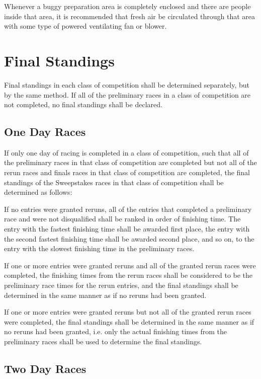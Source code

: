 	Whenever a buggy preparation area is completely enclosed and there are people
	inside that area, it is recommended that fresh air be circulated through that
	area with some type of powered ventilating fan or blower.

\section{Final Standings}

	Final standings in each class of competition shall be determined separately,
	but by the same method. If all of the preliminary races in a class of
	competition are not completed, no final standings shall be declared.

\subsection{One Day Races}

	If only one day of racing is completed in a class of competition, such that all
	of the preliminary races in that class of competition are completed but not all
	of the rerun races and finals races in that class of competition are completed,
	the final standings of the Sweepstakes races in that class of competition shall
	be determined as follows:
	\newline

	If no entries were granted reruns, all of the entries that completed a
	preliminary race and were not disqualified shall be ranked in order of
	finishing time. The entry with the fastest finishing time shall be awarded
	first place, the entry with the second fastest finishing time shall be awarded
	second place, and so on, to the entry with the slowest finishing time in the
	preliminary races.

	If one or more entries were granted reruns and all of the granted rerun races
	were completed, the finishing times from the rerun races shall be considered to
	be the preliminary race times for the rerun entries, and the final standings
	shall be determined in the same manner as if no reruns had been granted.

	If one or more entries were granted reruns but not all of the granted rerun
	races were completed, the final standings shall be determined in the same
	manner as if no reruns had been granted, i.e. only the actual finishing times
	from the preliminary races shall be used to determine the final standings.

\subsection{Two Day Races}

